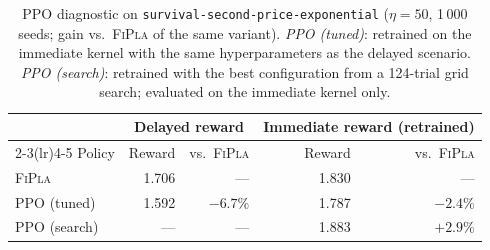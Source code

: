 \documentclass[11pt]{article}
\begin{document}

\begin{table}[H]
\centering
\caption{PPO diagnostic on \texttt{survival-second-price-exponential}
         ($\eta{=}50$, 1\,000 seeds; gain vs.\ \textsc{FiPla} of the
         same variant).
         \textit{PPO (tuned)}: retrained on the immediate kernel with
         the same hyperparameters as the delayed scenario.
         \textit{PPO (search)}: retrained with the best configuration
         from a 124-trial grid search; evaluated on the immediate kernel only.}
\label{tab:ppo-retrain-diagnostic}
\begin{tabular}{lrrrr}
\toprule
 & \multicolumn{2}{c}{Delayed reward} & \multicolumn{2}{c}{Immediate reward (retrained)} \\
\cmidrule(lr){2-3}\cmidrule(lr){4-5}
Policy & Reward & vs.\ \textsc{FiPla} & Reward & vs.\ \textsc{FiPla} \\
\midrule
\textsc{FiPla}        & 1.706 & ---      & 1.830 & ---      \\
\textsc{PPO} (tuned)  & 1.592 & $-6.7\%$ & 1.787 & $-2.4\%$ \\
\textsc{PPO} (search) & ---   & ---      & 1.883 & $+2.9\%$ \\
\bottomrule
\end{tabular}
\end{table}
\end{document}
